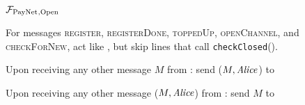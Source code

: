 \begin{figure}[!htbp]
  \begin{systembox}{$\mathcal{F}_{\mathrm{PayNet}}{}_{\mathrm{, Open}}$}
    \begin{algorithmic}[1]
      \State For messages \textsc{register}, \textsc{registerDone},
      \textsc{toppedUp}, \textsc{openChannel},
       and
      \textsc{checkForNew}, act like \fpaynet{}, but skip lines that call
      \texttt{checkClosed}().
      \Statex

      \State Upon receiving any other message $M$ from \alice:
      \Indent
          \State send ($M, \mathit{Alice}$) to \simulator
        \EndIf
      \EndIndent
      \Statex

      \State Upon receiving any other message ($M, \mathit{Alice}$) from \simulator:
      \Indent
          \State send $M$ to \alice
        \EndIf
      \EndIndent
    \end{algorithmic}
  \end{systembox}
  \caption{}
  \label{alg:proof:fpaynet:open}
\end{figure}

